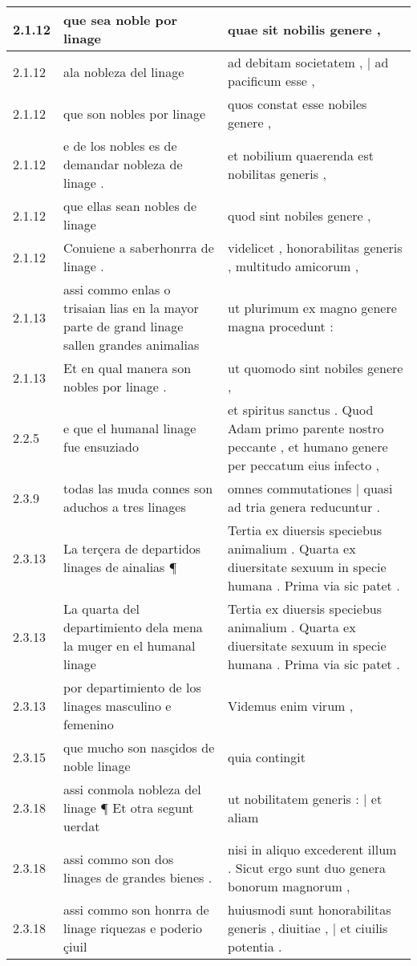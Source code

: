 \begin{tabular}{|p{1cm}|p{6.5cm}|p{6.5cm}|}
2.1.12 & que sea noble por linage & quae sit nobilis genere , \\\hline
2.1.12 & ala nobleza del linage & ad debitam societatem , | ad pacificum esse , \\\hline
2.1.12 & que son nobles por linage & quos constat esse nobiles genere , \\\hline
2.1.12 & e de los nobles es de demandar nobleza de linage . & et nobilium quaerenda est nobilitas generis , \\\hline
2.1.12 & que ellas sean nobles de linage & quod sint nobiles genere , \\\hline
2.1.12 & Conuiene a saberhonrra de linage . & videlicet , honorabilitas generis , multitudo amicorum , \\\hline
2.1.13 & assi commo enlas o trisaian lias en la mayor parte de grand linage sallen grandes animalias & ut plurimum ex magno genere magna procedunt : \\\hline
2.1.13 & Et en qual manera son nobles por linage . & ut quomodo sint nobiles genere , \\\hline
2.2.5 & e que el humanal linage fue ensuziado & et spiritus sanctus . Quod Adam primo parente nostro peccante , et humano genere per peccatum eius infecto , \\\hline
2.3.9 & todas las muda connes son aduchos a tres linages & omnes commutationes | quasi ad tria genera reducuntur . \\\hline
2.3.13 & La terçera de departidos linages de ainalias ¶ & Tertia ex diuersis speciebus animalium . Quarta ex diuersitate sexuum in specie humana . Prima via sic patet . \\\hline
2.3.13 & La quarta del departimiento dela mena la muger en el humanal linage & Tertia ex diuersis speciebus animalium . Quarta ex diuersitate sexuum in specie humana . Prima via sic patet . \\\hline
2.3.13 & por departimiento de los linages masculino e femenino & Videmus enim virum , \\\hline
2.3.15 & que mucho son nasçidos de noble linage & quia contingit \\\hline
2.3.18 & assi conmola nobleza del linage ¶ Et otra segunt uerdat & ut nobilitatem generis : | et aliam \\\hline
2.3.18 & assi commo son dos linages de grandes bienes . & nisi in aliquo excederent illum . Sicut ergo sunt duo genera bonorum magnorum , \\\hline
2.3.18 & assi commo son honrra de linage riquezas e poderio çiuil & huiusmodi sunt honorabilitas generis , diuitiae , | et ciuilis potentia . \\\hline

\end{tabular}
